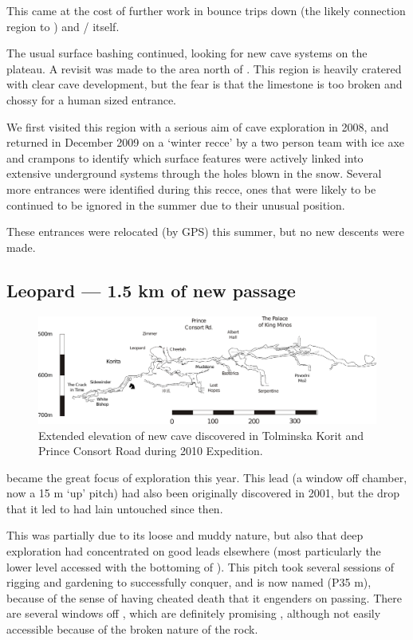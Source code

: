 This came at the cost of further work in bounce trips down  (the likely connection region to ) and  /  itself.

The usual surface bashing continued, looking for new cave systems on the
plateau. A revisit was made to the area north of . This region is
heavily cratered with clear cave development, but the fear is that the
limestone is too broken and chossy for a human sized entrance.

We first visited this region with a serious aim of cave exploration in
2008, and returned in December 2009 on a `winter recce' by a two person
team with ice axe and crampons to identify which surface features were
actively linked into extensive underground systems through the holes
blown in the snow. Several more entrances were identified during this
recce, ones that were likely to be continued to be ignored in the summer
due to their unusual position.

These entrances were relocated (by GPS) this summer, but no new descents were made.


\subsection{Leopard --- 1.5 km of new
passage}

\begin{figure}
\centering
\includegraphics[width=0.9\columnwidth]{2010/expo_findings/2010_new_stuff_extended_extraction.pdf}
\caption{Extended elevation of new cave discovered in Tolminska Korit and Prince
Consort Road during 2010 Expedition.}
\end{figure}

 became the great focus of exploration this year. This lead (a window off  chamber, now a 15 m `up' pitch) had also been originally discovered in 2001, but the drop that it led to had lain untouched since then.

This was partially due to its loose and muddy nature, but also that deep
exploration had concentrated on good leads elsewhere (most particularly
the lower  level accessed with the bottoming of
). This pitch took several sessions of rigging and
gardening to successfully conquer, and is now named  (P35
m), because of the sense of having cheated death that it engenders on
passing. There are several windows off ,
which are definitely promising
,
although not easily accessible because of the broken nature of the rock.

